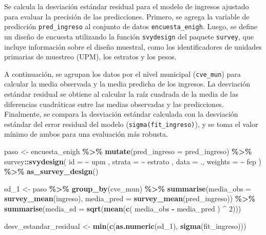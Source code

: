 \documentclass[
  12pt,
]{book}
\newenvironment{Shaded}{\begin{snugshade}}{\end{snugshade}}
\newcommand{\AttributeTok}[1]{\textcolor[rgb]{0.13,0.29,0.53}{#1}}
\newcommand{\DecValTok}[1]{\textcolor[rgb]{0.00,0.00,0.81}{#1}}
\newcommand{\FunctionTok}[1]{\textcolor[rgb]{0.13,0.29,0.53}{\textbf{#1}}}
\newcommand{\NormalTok}[1]{#1}
\newcommand{\OtherTok}[1]{\textcolor[rgb]{0.56,0.35,0.01}{#1}}
\newcommand{\SpecialCharTok}[1]{\textcolor[rgb]{0.81,0.36,0.00}{\textbf{#1}}}
\begin{document}
Se calcula la desviación estándar residual para el modelo de ingresos ajustado para evaluar la precisión de las predicciones. Primero, se agrega la variable de predicción \texttt{pred\_ingreso} al conjunto de datos \texttt{encuesta\_enigh}. Luego, se define un diseño de encuesta utilizando la función \texttt{svydesign} del paquete \texttt{survey}, que incluye información sobre el diseño muestral, como los identificadores de unidades primarias de muestreo (UPM), los estratos y los pesos.

A continuación, se agrupan los datos por el nivel municipal (\texttt{cve\_mun}) para calcular la media observada y la media predicha de los ingresos. La desviación estándar residual se obtiene al calcular la raíz cuadrada de la media de las diferencias cuadráticas entre las medias observadas y las predicciones. Finalmente, se compara la desviación estándar calculada con la desviación estándar del error residual del modelo (\texttt{sigma(fit\_ingreso)}), y se toma el valor mínimo de ambos para una evaluación más robusta.

\begin{Shaded}
\begin{Highlighting}[]
\NormalTok{paso }\OtherTok{\textless{}{-}}\NormalTok{ encuesta\_enigh }\SpecialCharTok{\%\textgreater{}\%} \FunctionTok{mutate}\NormalTok{(}\AttributeTok{pred\_ingreso =}\NormalTok{ pred\_ingreso) }\SpecialCharTok{\%\textgreater{}\%}
\NormalTok{  survey}\SpecialCharTok{::}\FunctionTok{svydesign}\NormalTok{(}
    \AttributeTok{id =}  \SpecialCharTok{\textasciitilde{}}\NormalTok{ upm ,}
    \AttributeTok{strata =} \SpecialCharTok{\textasciitilde{}}\NormalTok{ estrato ,}
    \AttributeTok{data =}\NormalTok{ .,}
    \AttributeTok{weights =} \SpecialCharTok{\textasciitilde{}}\NormalTok{ fep}
\NormalTok{  ) }\SpecialCharTok{\%\textgreater{}\%}
  \FunctionTok{as\_survey\_design}\NormalTok{()}

\NormalTok{sd\_1 }\OtherTok{\textless{}{-}}\NormalTok{ paso }\SpecialCharTok{\%\textgreater{}\%} \FunctionTok{group\_by}\NormalTok{(cve\_mun) }\SpecialCharTok{\%\textgreater{}\%}
  \FunctionTok{summarise}\NormalTok{(}\AttributeTok{media\_obs =} \FunctionTok{survey\_mean}\NormalTok{(ingreso),}
            \AttributeTok{media\_pred =} \FunctionTok{survey\_mean}\NormalTok{(pred\_ingreso)) }\SpecialCharTok{\%\textgreater{}\%}
  \FunctionTok{summarise}\NormalTok{(}\AttributeTok{media\_sd =} \FunctionTok{sqrt}\NormalTok{(}\FunctionTok{mean}\NormalTok{(}\FunctionTok{c}\NormalTok{(}
\NormalTok{    media\_obs }\SpecialCharTok{{-}}\NormalTok{ media\_pred}
\NormalTok{  ) }\SpecialCharTok{\^{}} \DecValTok{2}\NormalTok{)))}

\NormalTok{desv\_estandar\_residual }\OtherTok{\textless{}{-}}
  \FunctionTok{min}\NormalTok{(}\FunctionTok{c}\NormalTok{(}\FunctionTok{as.numeric}\NormalTok{(sd\_1), }\FunctionTok{sigma}\NormalTok{(fit\_ingreso)))}
\end{Highlighting}
\end{Shaded}
\end{document}
